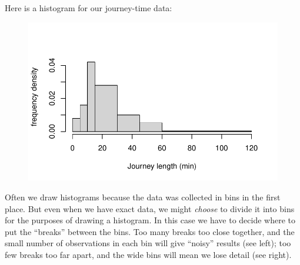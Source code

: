 \documentclass[
  letterpaper,
  DIV=11,
  numbers=noendperiod]{scrreprt}
\newenvironment{Shaded}{\begin{snugshade}}{\end{snugshade}}
\newcommand{\AttributeTok}[1]{\textcolor[rgb]{0.40,0.45,0.13}{#1}}
\newcommand{\DecValTok}[1]{\textcolor[rgb]{0.68,0.00,0.00}{#1}}
\newcommand{\FunctionTok}[1]{\textcolor[rgb]{0.28,0.35,0.67}{#1}}
\newcommand{\NormalTok}[1]{\textcolor[rgb]{0.00,0.23,0.31}{#1}}
\newcommand{\OtherTok}[1]{\textcolor[rgb]{0.00,0.23,0.31}{#1}}
\newcommand{\SpecialCharTok}[1]{\textcolor[rgb]{0.37,0.37,0.37}{#1}}
\newcommand{\StringTok}[1]{\textcolor[rgb]{0.13,0.47,0.30}{#1}}
\theoremstyle{remark}
\begin{document}
Here is a histogram for our journey-time data:

\begin{Shaded}
\end{Shaded}

\begin{figure}[H]

{\centering \includegraphics{sections/L02-dataviz_files/figure-pdf/journeys-1.pdf}

}

\end{figure}

Often we draw histograms because the data was collected in bins in the
first place. But even when we have exact data, we might \emph{choose} to
divide it into bins for the purposes of drawing a histogram. In this
case we have to decide where to put the ``breaks'' between the bins. Too
many breaks too close together, and the small number of observations in
each bin will give ``noisy'' results (see left); too few breaks too far
apart, and the wide bins will mean we lose detail (see right).
\end{document}
